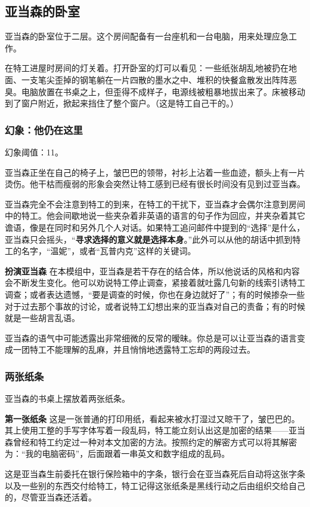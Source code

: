 \subsection{亚当森的卧室}
亚当森的卧室位于二层。这个房间配备有一台座机和一台电脑，用来处理应急工作。

在特工进屋时房间的灯关着。打开卧室的灯可以看见：一些纸张胡乱地被扔在地面、一支笔尖歪掉的钢笔躺在一片四散的墨水之中、堆积的快餐盒散发出阵阵恶臭。电脑放置在书桌之上，但歪得不成样子，电源线被粗暴地拔出来了。床被移动到了窗户附近，掀起来挡住了整个窗户。（这是特工自己干的。）

\subsubsection{幻象：他仍在这里}

幻象阈值：11。

亚当森正坐在自己的椅子上，皱巴巴的领带，衬衫上沾着一些血迹，额头上有一片烫伤。他干枯而瘦弱的形象会突然让特工感到已经有很长时间没有见到过亚当森。

亚当森完全不会注意到特工的到来，在特工的干扰下，亚当森才会偶尔注意到房间中的特工。他会间歇地说一些夹杂着非英语的语言的句子作为回应，并夹杂着其它谵语，像是在同时和另外几个人对话。如果特工追问邮件中提到的“选择”是什么，亚当森只会摇头，“\textbf{寻求选择的意义就是选择本身}。”此外可以从他的胡话中抓到特工的名字，“温妮”，或者“瓦普内克”这样的关键词。

\textbf{扮演亚当森}
在本模组中，亚当森是若干存在的结合体，所以他说话的风格和内容会不断发生变化。他可以劝说特工停止调查，紧接着就吐露几句新的线索引诱特工调查；或者表达遗憾，“要是调查的时候，你也在身边就好了”；有的时候掺杂一些对于过去那个事故的讨论，或者说特工幻想出来的亚当森对自己的责备；有的时候就是一些胡言乱语。

亚当森的语气中可能透露出非常细微的反常的暧昧。你总是可以让亚当森的语言变成一团特工不能理解的乱麻，并且悄悄地透露特工忘却的两段过去。

\subsubsection{两张纸条}
亚当森的书桌上摆放着两张纸条。

\textbf{第一张纸条}
这是一张普通的打印用纸，看起来被水打湿过又晾干了，皱巴巴的。其上使用工整的手写字体写着一段乱码，特工能立刻认出这是加密的结果——亚当森曾经和特工约定过一种对本文加密的方法。按照约定的解密方式可以将其解密为：“我的电脑密码”，后面跟着一串英文和数字组成的乱码。

这是亚当森生前委托在银行保险箱中的字条，银行会在亚当森死后自动将这张字条以及一些别的东西交付给特工，特工记得这张纸条是黑线行动之后由组织交给自己的，尽管亚当森还活着。

